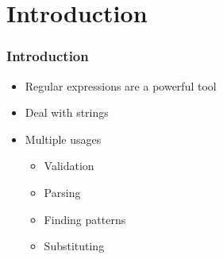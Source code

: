 \section{Introduction}

\frame{\tableofcontents[currentsection]}

\begin{frame}
  \frametitle{Introduction}
  \begin{itemize}
    \item Regular expressions are a powerful tool
    \item Deal with strings
    \item Multiple usages
      \begin{itemize}
        \item Validation
        \item Parsing
        \item Finding patterns
        \item Substituting
      \end{itemize}
  \end{itemize}
\end{frame}
